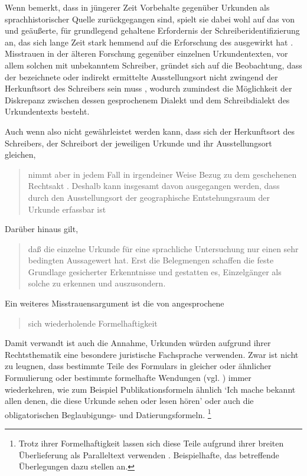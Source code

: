 Wenn \citeauthor{schulze2011} bemerkt, dass in jüngerer Zeit Vorbehalte
gegenüber Urkunden als sprachhistorischer Quelle zurückgegangen sind, spielt
sie dabei wohl auf das von \citet[23--33]{boesch1946} und
\citet[389]{haacke1955} geäußerte, für grundlegend gehaltene Erfordernis der
Schrei\-ber\-identifizierung an, das sich lange Zeit stark hemmend auf die
Erforschung des \CAO{} ausgewirkt hat \autocite[21--22]{schulze2011}.
Misstrauen in der älteren Forschung gegenüber einzelnen Urkunden\-texten, vor
allem solchen mit unbekanntem Schreiber, gründet sich auf die Beobachtung, dass
der bezeichnete oder indirekt ermittelte Ausstellungsort nicht zwingend der
Herkunftsort des Schreibers sein muss
\autocite[16]{schulze2011}, wodurch zumindest die Möglichkeit der Diskrepanz
zwischen dessen gesprochenem Dialekt und dem Schreibdialekt des Urkundentexts
besteht.

Auch wenn also nicht gewährleistet werden kann, dass sich der Herkunftsort des
Schreibers, der Schreibort der jeweiligen Urkunde und ihr Ausstellungsort
gleichen, \blockcquote[331--332]{ganslmayeretal2003}{nimmt  aber in jedem Fall in irgendeiner Weise Bezug zu dem
geschehenen Rechtsakt \textelp{}. Deshalb kann insgesamt davon ausgegangen
werden, dass durch den Ausstellungsort der geographische Entstehungsraum der
Urkunde erfassbar ist}.
Darüber hinaus gilt, \blockcquote[122]{deboor1974}{daß die einzelne Urkunde für
eine sprachliche Untersuchung nur einen sehr bedingten Aussagewert hat. Erst
die Belegmengen schaffen die feste Grundlage gesicherter Erkenntnisse und
gestatten es, Einzelgänger als solche zu erkennen und auszusondern.}

Ein weiteres Misstrauensargument ist die von \citet[1311]{wegera2000}
angesprochene \blockquote{sich wiederholende Formelhaftigkeit}. Damit verwandt
ist auch die Annahme, Urkunden würden aufgrund ihrer Rechtsthematik eine
besondere juristische Fachsprache verwenden. Zwar ist nicht zu leugnen, dass
bestimmte Teile des Formulars in gleicher oder ähnlicher Formulierung oder
bestimmte formelhafte Wendungen (vgl. ) immer
wiederkehren, wie zum Beispiel Publikationsformeln ähnlich  `Ich mache bekannt allen
denen, die diese Urkunde sehen oder lesen hören' oder auch die obligatorischen
Beglaubigungs- und Datierungsformeln.%
%
	\footnote{%
	Trotz ihrer Formelhaftigkeit lassen sich diese Teile
	aufgrund ihrer breiten Überlieferung als Paralleltext verwenden
	\autocite[siehe][]{cysouwwaelchli2007}. Beispielhafte, das \CAO{}
	betreffende Überlegungen dazu stellen
	\citet[174--175]{beckerschallert2022b} an.}


